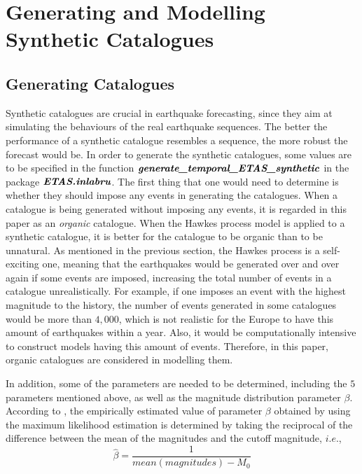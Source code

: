 \documentclass[11pt,twoside]{article}
\numberwithin{Theorem}{section}
\numberwithin{Definition}{section}
\numberwithin{Lemma}{section}
\numberwithin{Algorithm}{section}
\numberwithin{equation}{section}
\begin{document}
\section{Generating and Modelling Synthetic Catalogues}
\label{sec:synth}

\subsection{Generating Catalogues}
Synthetic catalogues are crucial in earthquake forecasting, since they aim at simulating the behaviours of the real earthquake sequences. The better the performance of a synthetic catalogue resembles a sequence, the more robust the forecast would be. In order to generate the synthetic catalogues, some values are to be specified in the function $\textbf{\textit{generate\_temporal\_ETAS\_synthetic}}$ in the package $\textbf{\textit{ETAS.inlabru}}$. The first thing that one would need to determine is whether they should impose any events in generating the catalogues. When a catalogue is being generated without imposing any events, it is regarded in this paper as an \textit{organic} catalogue. When the Hawkes process model is applied to a synthetic catalogue, it is better for the catalogue to be organic than to be unnatural. As mentioned in the previous section, the Hawkes process is a self-exciting one, meaning that the earthquakes would be generated over and over again if some events are imposed, increasing the total number of events in a catalogue unrealistically. For example, if one imposes an event with the highest magnitude to the history, the number of events generated in some catalogues would be more than $4,000$, which is not realistic for the Europe to have this amount of earthquakes within a year. Also, it would be computationally intensive to construct models having this amount of events. Therefore, in this paper, organic catalogues are considered in modelling them.

In addition, some of the parameters are needed to be determined, including the $5$ parameters mentioned above, as well as the magnitude distribution parameter $\beta$. According to \cite{edinburghseismicityhubTemporalModeld}, the empirically estimated value of parameter $\beta$ obtained by using the maximum likelihood estimation is determined by taking the reciprocal of the difference between the mean of the magnitudes and the cutoff magnitude, $i.e.$, 
\begin{equation}\label{eqn:beta}
\hat \beta  = \frac{1}{{mean(magnitudes) - {M_0}}}
\end{equation}
 
\end{document}
